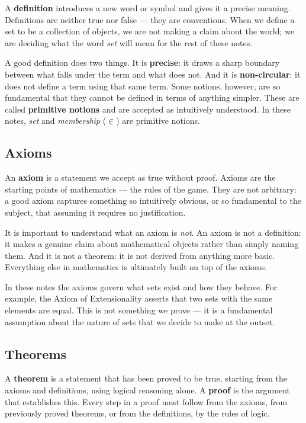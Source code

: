\documentclass[a4paper]{article}
\begin{document}
A \textbf{definition} introduces a new word or symbol and gives it a precise
meaning. Definitions are neither true nor false --- they are conventions. When
we define a set to be a collection of objects, we are not making a claim about
the world; we are deciding what the word \emph{set} will mean for the rest of
these notes.

A good definition does two things. It is \textbf{precise}: it draws a sharp
boundary between what falls under the term and what does not. And it is
\textbf{non-circular}: it does not define a term using that same term.
Some notions, however, are so fundamental that they cannot be defined in terms
of anything simpler. These are called \textbf{primitive notions} and are
accepted as intuitively understood. In these notes, \emph{set} and
\emph{membership} ($\in$) are primitive notions.

\subsection*{Axioms}

An \textbf{axiom} is a statement we accept as true without proof. Axioms are
the starting points of mathematics --- the rules of the game. They are not
arbitrary: a good axiom captures something so intuitively obvious, or so
fundamental to the subject, that assuming it requires no justification.

It is important to understand what an axiom is \emph{not}. An axiom is not a
definition: it makes a genuine claim about mathematical objects rather than
simply naming them. And it is not a theorem: it is not derived from anything
more basic. Everything else in mathematics is ultimately built on top of the
axioms.

In these notes the axioms govern what sets exist and how they behave. For
example, the Axiom of Extensionality asserts that two sets with the same
elements are equal. This is not something we prove --- it is a fundamental
assumption about the nature of sets that we decide to make at the outset.

\subsection*{Theorems}

A \textbf{theorem} is a statement that has been proved to be true, starting
from the axioms and definitions, using logical reasoning alone. A
\textbf{proof} is the argument that establishes this. Every step in a proof
must follow from the axioms, from previously proved theorems, or from the
definitions, by the rules of logic.
\end{document}
